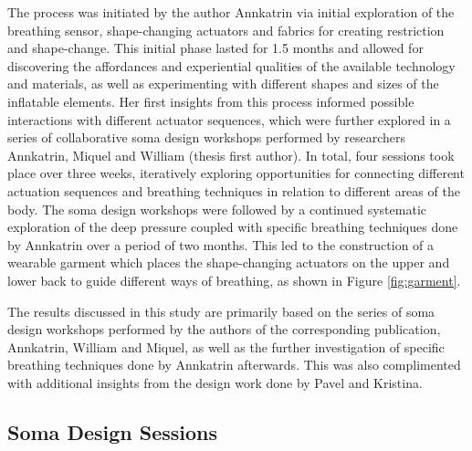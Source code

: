 The process was initiated by the author Annkatrin \cite{jung_exploring_2021} via initial exploration of the breathing sensor, shape-changing actuators and fabrics for creating restriction and shape-change. This initial phase lasted for 1.5 months and allowed for discovering the affordances and experiential qualities of the available technology and materials, as well as experimenting with different shapes and sizes of the inflatable elements. Her first insights from this process informed possible interactions with different actuator sequences, which were further explored in a series of collaborative soma design workshops \cite{hook_designing_2018} performed by researchers Annkatrin, Miquel and William (thesis first author).
In total, four sessions took place over three weeks, iteratively exploring opportunities for connecting different actuation sequences and breathing techniques in relation to different areas of the body. The soma design workshops were followed by a continued systematic exploration of the deep pressure coupled with specific breathing techniques done by Annkatrin over a period of two months. This led to the construction of a wearable garment which places the shape-changing actuators on the upper and lower back to guide different ways of breathing, as shown in Figure \ref{fig:garment}.


The results discussed in this study are primarily based on the series of soma design workshops performed by the authors of the corresponding publication, Annkatrin, William and Miquel, as well as the further investigation of specific breathing techniques done by Annkatrin afterwards. This was also complimented with additional insights from the design work done by Pavel and Kristina.

\subsection*{Soma Design Sessions}
\label{sec:soma_workshops}

